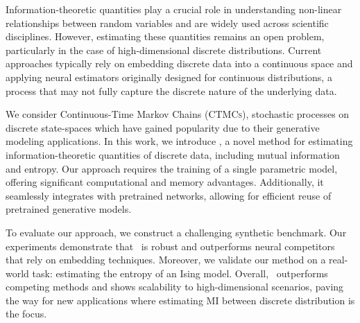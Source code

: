 Information-theoretic quantities play a crucial role in understanding non-linear relationships between random variables and are widely used across scientific disciplines. However, estimating these quantities remains an open problem, particularly in the case of high-dimensional discrete distributions. Current approaches typically rely on embedding discrete data into a continuous space and applying neural estimators originally designed for continuous distributions, a process that may not fully capture the discrete nature of the underlying data.

We consider Continuous-Time Markov Chains (\textsc{CTMCs}), stochastic processes on discrete state-spaces which have gained popularity due to their generative modeling applications. In this work, we introduce \infosedd, a novel method for estimating information-theoretic quantities of discrete data, including mutual information and entropy. Our approach requires the training of a single parametric model, offering significant computational and memory advantages. Additionally, it seamlessly integrates with pretrained networks, allowing for efficient reuse of pretrained generative models.

To evaluate our approach, we construct a challenging synthetic benchmark. Our experiments demonstrate that \infosedd\ is robust and outperforms neural competitors that rely on embedding techniques. Moreover, we validate our method on a real-world task: estimating the entropy of an Ising model. Overall, \infosedd\ outperforms competing methods and shows scalability to high-dimensional scenarios, paving the way for new applications where estimating MI between discrete distribution is the focus.%

